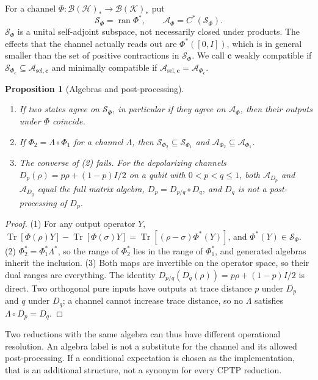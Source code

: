 \documentclass[12pt,a4paper]{article}
\newtheorem{proposition}[theorem]{Proposition}
\begin{document}
For a channel $\Phi:\mathcal B(\mathcal H)_*\to\mathcal B(\mathcal K)_*$ put
\[
\mathcal S_\Phi=\operatorname{ran}\Phi^*,\qquad
\mathcal A_\Phi=C^*(\mathcal S_\Phi).
\]
$\mathcal S_\Phi$ is a unital self-adjoint subspace, not necessarily closed under products. The effects that the channel actually reads out are $\Phi^*([0,I])$, which is in general smaller than the set of positive contractions in $\mathcal S_\Phi$. We call $\mathbf c$ weakly compatible if $\mathcal S_{\Phi_{\mathbf c}}\subseteq\mathcal A_{\mathrm{sel},\mathbf c}$ and minimally compatible if $\mathcal A_{\mathrm{sel},\mathbf c}=\mathcal A_{\Phi_{\mathbf c}}$.

\begin{proposition}[Algebras and post-processing]
\label{prop:algebra}
\begin{enumerate}
\item If two states agree on $\mathcal S_\Phi$, in particular if they agree on $\mathcal A_\Phi$, then their outputs under $\Phi$ coincide.
\item If $\Phi_2=\Lambda\circ\Phi_1$ for a channel $\Lambda$, then $\mathcal S_{\Phi_2}\subseteq\mathcal S_{\Phi_1}$ and $\mathcal A_{\Phi_2}\subseteq\mathcal A_{\Phi_1}$.
\item The converse of (2) fails. For the depolarizing channels $D_p(\rho)=p\rho+(1-p)I/2$ on a qubit with $0<p<q\le1$, both $\mathcal A_{D_p}$ and $\mathcal A_{D_q}$ equal the full matrix algebra, $D_p=D_{p/q}\circ D_q$, and $D_q$ is not a post-processing of $D_p$.
\end{enumerate}
\end{proposition}

\begin{proof}
(1) For any output operator $Y$, $\operatorname{Tr}[\Phi(\rho)Y]-\operatorname{Tr}[\Phi(\sigma)Y]=\operatorname{Tr}[(\rho-\sigma)\Phi^*(Y)]$, and $\Phi^*(Y)\in\mathcal S_\Phi$. (2) $\Phi_2^*=\Phi_1^*\Lambda^*$, so the range of $\Phi_2^*$ lies in the range of $\Phi_1^*$, and generated algebras inherit the inclusion. (3) Both maps are invertible on the operator space, so their dual ranges are everything. The identity $D_{p/q}(D_q(\rho))=p\rho+(1-p)I/2$ is direct. Two orthogonal pure inputs have outputs at trace distance $p$ under $D_p$ and $q$ under $D_q$; a channel cannot increase trace distance, so no $\Lambda$ satisfies $\Lambda\circ D_p=D_q$.
\end{proof}

Two reductions with the same algebra can thus have different operational resolution. An algebra label is not a substitute for the channel and its allowed post-processing. If a conditional expectation is chosen as the implementation, that is an additional structure, not a synonym for every CPTP reduction.
\end{document}
